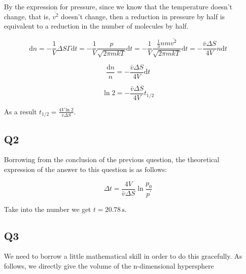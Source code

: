\documentclass[a4paper,11pt]{amsart}
\theoremstyle{definition}
\begin{document}
	By the expression for pressure, since we know that the temperature doesn't change, that is, $\overline{v^2}$ doesn't change, then a reduction in pressure by half is equivalent to a reduction in the number of molecules by half.

	$$
	\mathrm{d}n=-\frac{1}{V}\Delta S\varGamma \mathrm{d}t=-\frac{1}{V}\frac{p}{\sqrt{2\pi mkT}}\mathrm{d}t=-\frac{1}{V}\frac{\frac{1}{3}nm\overline{v^2}}{\sqrt{2\pi mkT}}\mathrm{d}t=-\frac{\bar{v}\Delta S}{4V}n\mathrm{d}t
	$$

	$$
	\frac{\mathrm{d}n}{n}=-\frac{\bar{v}\Delta S}{4V}\mathrm{d}t
	$$

	$$
	\ln 2=-\frac{\bar{v}\Delta S}{4V}t_{1/2}
	$$

	As a result $\displaystyle t_{1/2}=\frac{4V\ln 2}{\bar{v}\Delta S}$.

	\subsection*{Q2}

	Borrowing from the conclusion of the previous question, the theoretical expression of the answer to this question is as follows:

	$$
	\Delta t=\frac{4V}{\bar{v}\Delta S}\ln \frac{p_0}{p^{\prime}}
	$$

	Take into the number we get $t=20.78\,\mathrm{s}$.

	\subsection*{Q3}

	We need to borrow a little mathematical skill in order to do this gracefully. As follows, we directly give the volume of the n-dimensional hypersphere
\end{document}

